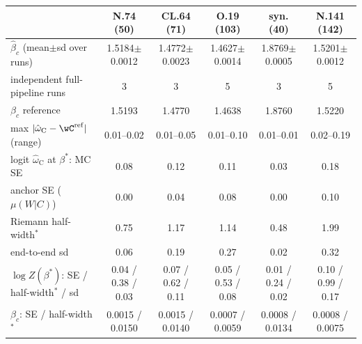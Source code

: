 \begin{tabular}{lccccc}
\toprule
 & N.74 (50) & CL.64 (71) & O.19 (103) & syn. (40) & N.141 (142) \\
\midrule
$\hat\beta_c$ (mean$\pm$sd over runs) & 1.5184$\pm$0.0012 & 1.4772$\pm$0.0023 & 1.4627$\pm$0.0014 & 1.8769$\pm$0.0005 & 1.5201$\pm$0.0012 \\
independent full-pipeline runs & 3 & 3 & 5 & 3 & 5 \\
$\beta_c$ reference & 1.5193 & 1.4770 & 1.4638 & 1.8760 & 1.5220 \\
max $|\hat\omega_{\mathrm C}-\wC^{\rm ref}|$ (range) & 0.01--0.02 & 0.01--0.05 & 0.01--0.10 & 0.01--0.01 & 0.02--0.19 \\
\midrule
logit $\hat\omega_{\mathrm C}$ at $\beta^\ast$: MC SE & 0.08 & 0.12 & 0.11 & 0.03 & 0.18 \\
\quad anchor SE ($\mu(W|C)$) & 0.00 & 0.04 & 0.08 & 0.00 & 0.10 \\
\quad Riemann half-width$^\ast$ & 0.75 & 1.17 & 1.14 & 0.48 & 1.99 \\
\quad end-to-end sd & 0.06 & 0.19 & 0.27 & 0.02 & 0.32 \\
$\log Z(\beta^\ast)$: SE / half-width$^\ast$ / sd & 0.04 / 0.38 / 0.03 & 0.07 / 0.62 / 0.11 & 0.05 / 0.53 / 0.08 & 0.01 / 0.24 / 0.02 & 0.10 / 0.99 / 0.17 \\
$\beta_c$: SE / half-width$^\ast$ & 0.0015 / 0.0150 & 0.0015 / 0.0140 & 0.0007 / 0.0059 & 0.0008 / 0.0134 & 0.0008 / 0.0075 \\
\bottomrule
\end{tabular}
